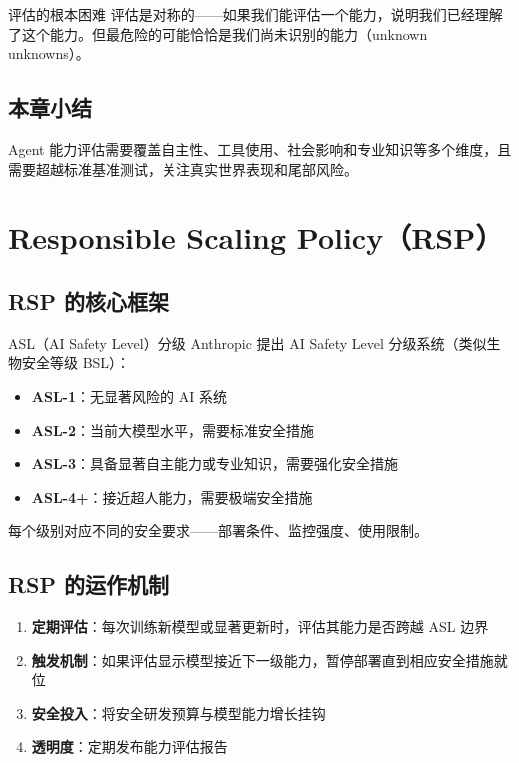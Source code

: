 \documentclass[a4paper]{article}
\begin{document}
\begin{warningbox}{评估的根本困难}
评估是对称的——如果我们能评估一个能力，说明我们已经理解了这个能力。但最危险的可能恰恰是我们尚未识别的能力（unknown unknowns）。
\end{warningbox}

\subsection{本章小结}

Agent 能力评估需要覆盖自主性、工具使用、社会影响和专业知识等多个维度，且需要超越标准基准测试，关注真实世界表现和尾部风险。

\section{Responsible Scaling Policy（RSP）}

\subsection{RSP 的核心框架}

\begin{importantbox}{ASL（AI Safety Level）分级}
Anthropic 提出 AI Safety Level 分级系统（类似生物安全等级 BSL）：
\begin{itemize}
    \item \textbf{ASL-1}：无显著风险的 AI 系统
    \item \textbf{ASL-2}：当前大模型水平，需要标准安全措施
    \item \textbf{ASL-3}：具备显著自主能力或专业知识，需要强化安全措施
    \item \textbf{ASL-4+}：接近超人能力，需要极端安全措施
\end{itemize}
每个级别对应不同的安全要求——部署条件、监控强度、使用限制。
\end{importantbox}

\subsection{RSP 的运作机制}

\begin{enumerate}
    \item \textbf{定期评估}：每次训练新模型或显著更新时，评估其能力是否跨越 ASL 边界
    \item \textbf{触发机制}：如果评估显示模型接近下一级能力，暂停部署直到相应安全措施就位
    \item \textbf{安全投入}：将安全研发预算与模型能力增长挂钩
    \item \textbf{透明度}：定期发布能力评估报告
\end{enumerate}
\end{document}
